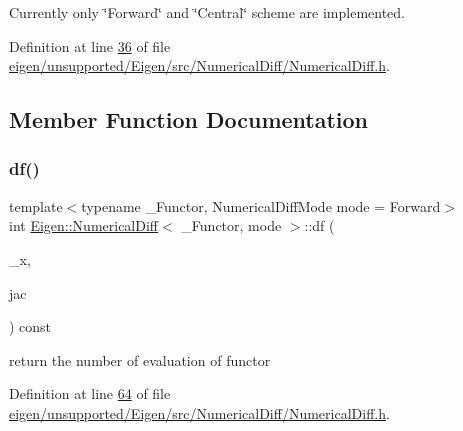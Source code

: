 Currently only \char`\"{}\+Forward\char`\"{} and \char`\"{}\+Central\char`\"{} scheme are implemented. 

Definition at line \hyperlink{eigen_2unsupported_2_eigen_2src_2_numerical_diff_2_numerical_diff_8h_source_l00036}{36} of file \hyperlink{eigen_2unsupported_2_eigen_2src_2_numerical_diff_2_numerical_diff_8h_source}{eigen/unsupported/\+Eigen/src/\+Numerical\+Diff/\+Numerical\+Diff.\+h}.



\subsection{Member Function Documentation}
\mbox{\label{class_eigen_1_1_numerical_diff_a8fc63f1c3307cc6e61dc4d70c57b5037}} 
\subsubsection{\texorpdfstring{df()}{df()}\hspace{0.1cm}{\footnotesize\ttfamily [1/2]}}
{\footnotesize\ttfamily template$<$typename \+\_\+\+Functor, Numerical\+Diff\+Mode mode = Forward$>$ \\
int \hyperlink{class_eigen_1_1_numerical_diff}{Eigen\+::\+Numerical\+Diff}$<$ \+\_\+\+Functor, mode $>$\+::df (\begin{DoxyParamCaption}\item[{const Input\+Type \&}]{\+\_\+x,  }\item[{Jacobian\+Type \&}]{jac }\end{DoxyParamCaption}) const\hspace{0.3cm}{\ttfamily [inline]}}

return the number of evaluation of functor 

Definition at line \hyperlink{eigen_2unsupported_2_eigen_2src_2_numerical_diff_2_numerical_diff_8h_source_l00064}{64} of file \hyperlink{eigen_2unsupported_2_eigen_2src_2_numerical_diff_2_numerical_diff_8h_source}{eigen/unsupported/\+Eigen/src/\+Numerical\+Diff/\+Numerical\+Diff.\+h}.

\mbox{\label{class_eigen_1_1_numerical_diff_a8fc63f1c3307cc6e61dc4d70c57b5037}} 
